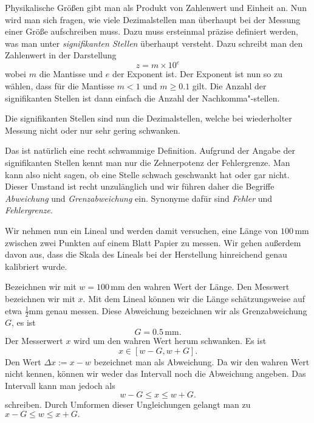 \documentclass[a4paper,10pt,fleqn,twocolumn,twoside]{scrartcl}
\numberwithin{equation}{section}
\begin{document}
Physikalische Größen gibt man als Produkt von Zahlenwert und Einheit
an. Nun wird man sich fragen, wie viele Dezimalstellen man überhaupt
bei der Messung einer Größe aufschreiben muss. Dazu muss ersteinmal
präzise definiert werden, was man unter
\textit{signifikanten Stellen} überhaupt versteht. Dazu schreibt man
den Zahlenwert in der Darstellung
\begin{equation}
z = m\times 10^{e}
\end{equation}
wobei $m$ die Mantisse und $e$ der Exponent ist. Der Exponent
ist nun so zu wählen, dass für die Mantisse $m<1$ und $m\ge 0.1$
gilt. Die Anzahl der signifikanten Stellen ist dann einfach die
Anzahl der Nachkomma"-stellen.

Die signifikanten Stellen sind nun die Dezimalstellen, welche bei
wiederholter Messung nicht oder nur sehr gering schwanken.

Das ist natürlich eine recht schwammige Definition. Aufgrund der
Angabe der signifikanten Stellen kennt man nur die Zehnerpotenz
der Fehlergrenze. Man kann also nicht sagen, ob eine Stelle schwach
geschwankt hat oder gar nicht. Dieser Umstand ist recht unzulänglich
und wir führen daher die Begriffe \emph{Abweichung} und
\emph{Grenzabweichung} ein. Synonyme dafür sind \emph{Fehler} und
\emph{Fehlergrenze}.

Wir nehmen nun ein Lineal und werden damit versuchen, eine Länge
von $100\,\mathrm{mm}$
zwischen zwei Punkten auf einem Blatt Papier zu messen. Wir gehen
außerdem davon aus, dass die Skala des Lineals bei der Herstellung
hinreichend genau kalibriert wurde.

Bezeichnen wir mit $w=100\,\mathrm{mm}$ den wahren Wert der Länge.
Den Messwert bezeichnen wir mit $x$. Mit dem Lineal können wir
die Länge schätzungsweise auf etwa $\frac{1}{2}\mathrm{mm}$ genau
messen. Diese Abweichung bezeichnen wir als Grenzabweichung $G$,
es ist
\begin{equation}
G = 0.5\,\mathrm{mm}.
\end{equation}
Der Messerwert $x$ wird um den wahren Wert herum schwanken. Es ist
\begin{equation}
x\in [w-G,w+G].
\end{equation}
Den Wert $\Delta x := x-w$ bezeichnet man als Abweichung. Da wir
den wahren Wert nicht kennen, können wir weder das Intervall noch
die Abweichung angeben. Das Intervall kann man jedoch als
\begin{equation}
w-G\le x\le w+G.
\end{equation}
schreiben. Durch Umformen dieser Ungleichungen gelangt man zu
$x-G\le w\le x+G.$
\end{document}
